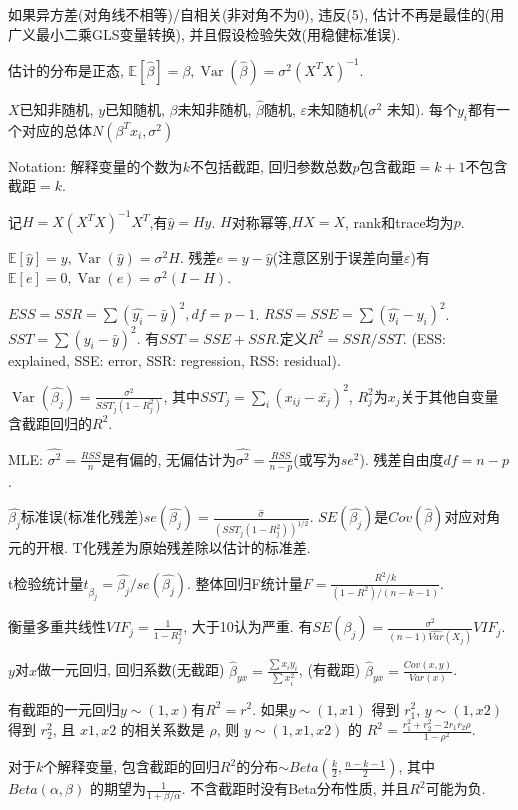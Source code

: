 \documentclass[UTF8]{ctexart}
\begin{document}
如果异方差(对角线不相等)/自相关(非对角不为0), 违反(5), 估计不再是最佳的(用广义最小二乘GLS变量转换),
并且假设检验失效(用稳健标准误).

估计的分布是正态, $\mathbb{E}[\hat{\beta}]=\beta, \operatorname{Var}(\hat{\beta})=\sigma^2(X^TX)^{-1}$.


$X$已知非随机, $y$已知随机, $\beta$未知非随机, $\hat{\beta}$随机, $\varepsilon$未知随机($\sigma^2$ 未知).
每个$y_i$都有一个对应的总体$N(\beta^T x_i, \sigma^2)$

Notation: 解释变量的个数为$k$不包括截距, 回归参数总数$p$包含截距$=k+1$不包含截距$=k$.

记$H=X(X^TX)^{-1}X^T$,有$\hat{y}=Hy$. $H$对称幂等,$HX=X$, rank和trace均为$p$.

$\mathbb{E}[\hat{y}]=y, \operatorname{Var}(\hat{y})=\sigma^2H$.
残差$e=y-\hat{y}$(注意区别于误差向量$\varepsilon$)有
$\mathbb{E}[e]=0, \operatorname{Var}(e)=\sigma^2 (I-H)$.

$ESS = SSR = \sum (\hat{y_i}-\bar{y})^2, df=p-1$.
$RSS = SSE = \sum (\hat{y_i}-y_i)^2$.
$SST = \sum (y_i-\bar{y})^2$.
有$SST=SSE+SSR$.定义$R^2=SSR/SST$.
(ESS: explained, SSE: error, SSR: regression, RSS: residual).

$\operatorname{Var}(\hat{\beta_j}) = \frac{\sigma^2}{SST_j(1-R_j^2)}$,
其中$SST_j=\sum_i (x_{ij}-\bar{x_j})^2$, $R_j^2$为$x_j$关于其他自变量含截距回归的$R^2$.

MLE: $\hat{\sigma^2}=\frac{RSS}{n}$是有偏的,
无偏估计为$\hat{\sigma^2}=\frac{RSS}{n-p}$(或写为$se^2$). 残差自由度$df=n-p$.

$\hat{\beta_j}$标准误(标准化残差)$se(\hat{\beta_j}) = \frac{\hat{\sigma}}{(SST_j(1-R_j^2))^{1/2}}$.
$SE(\hat{\beta_j})$是$Cov(\hat{\beta})$对应对角元的开根.
T化残差为原始残差除以估计的标准差.


t检验统计量$t_{\hat{\beta_j}} = \hat{\beta_j}/se(\hat{\beta_j})$.
整体回归F统计量$F=\frac{R^2/k}{(1-R^2)/(n-k-1)}$.

衡量多重共线性$VIF_j = \frac{1}{1-R_j^2}$, 大于10认为严重.
有$SE(\beta_j)=\frac{\sigma^2}{(n-1)\hat{Var}(X_j)}VIF_j$.

$y$对$x$做一元回归, 回归系数(无截距) $\hat{\beta}_{yx}=\frac{\sum x_i y_i}{\sum x_i^2}$, 
(有截距) $\hat{\beta}_{yx}=\frac{Cov(x,y)}{Var(x)}$.

有截距的一元回归$y\sim(1,x)$有$R^2=r^2$.
如果$y\sim(1,x1)$ 得到 $r_1^2$, $y\sim(1,x2)$ 得到 $r_2^2$, 且 $x1, x2$ 的相关系数是 $\rho$,
则 $y\sim(1,x1,x2)$ 的 $R^2 = \frac{r_1^2 + r_2^2 - 2r_1r_2\rho}{1-\rho^2}$.

对于$k$个解释变量, 包含截距的回归$R^2$的分布$\sim Beta(\frac{k}{2},\frac{n-k-1}{2})$,
其中 $Beta(\alpha,\beta)$ 的期望为$\frac{1}{1+\beta/\alpha}$.
不含截距时没有Beta分布性质, 并且$R^2$可能为负.
\end{document}
